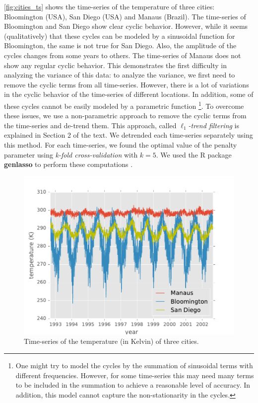 \documentclass{article}
\begin{document}
\autoref{fig:cities_ts} shows the time-series of the temperature of three cities: Bloomington (USA), San Diego (USA) and Manaus (Brazil). The time-series of Bloomington and San Diego show clear cyclic behavior. However, while it seems (qualitatively) that these cycles can be modeled by a sinusoidal function for Bloomington, the same is not true for San Diego. Also, the amplitude of the cycles changes from some years to others. The time-series of Manaus does not show any regular cyclic behavior. This demonstrates the first difficulty in analyzing the variance of this data: to analyze the variance, we first need to remove the cyclic terms from all time-series. However, there is a lot of variations in the cyclic behavior of the time-series of different locations. In addition, some of these cycles cannot be easily modeled by a parametric function \footnote{One might try to model the cycles by the summation of sinusoidal terms with different frequencies. However, for some time-series this may need many terms to be included in the summation to achieve a reasonable level of accuracy. In addition, this model cannot capture the non-stationarity in the cycles.}. To overcome these issues, we use a non-parametric approach to remove the cyclic terms from the time-series and de-trend them. This approach, called \textit{$\ell_1$-trend filtering} is explained in Section 2 of the text. We detrended each time-series separately using this method. For each time-series, we found the optimal value of the penalty parameter using \textit{k-fold cross-validation} with $k=5$. We used the R package \textbf{genlasso} to perform these computations \cite{arnold_efficient_2016}. 


\begin{figure}[tb]
	\centering
	\includegraphics[width=.2\textheight]{Figures/cities_ts}
 	\caption{Time-series of the temperature (in Kelvin) of three cities.}
 	\label{fig:cities_ts}
\end{figure} 
\end{document}
